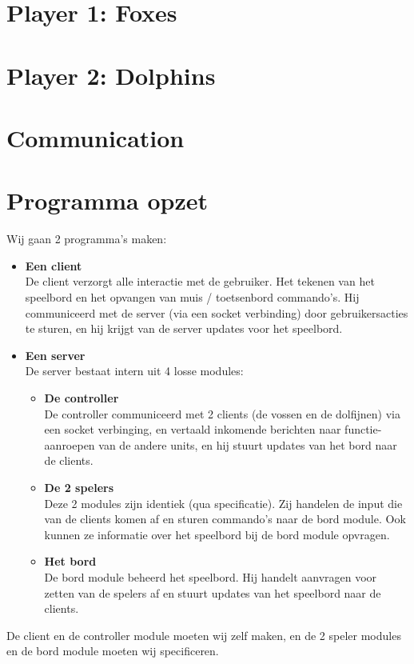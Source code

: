 \documentclass[a4paper,twoside,11pt]{article}
\begin{document}
\section{Player 1: Foxes}

\section{Player 2: Dolphins}

\section{Communication}

\section{Programma opzet} %
\label{sec:programma_opzet}
Wij gaan 2 programma's maken:
\begin{itemize}
\item \textbf{Een client} \\
De client verzorgt alle interactie met de gebruiker. Het tekenen van het speelbord en het opvangen van muis / toetsenbord commando's. Hij communiceerd met de server (via een socket verbinding) door gebruikersacties te sturen, en hij krijgt van de server updates voor het speelbord.
\item \textbf{Een server} \\
De server bestaat intern uit 4 losse modules:
  \begin{itemize}
  \item \textbf{De controller} \\
  De controller communiceerd met 2 clients (de vossen en de dolfijnen) via een socket verbinging, en vertaald inkomende berichten naar functie-aanroepen van de andere units, en hij stuurt updates van het bord naar de clients.
  \item \textbf{De 2 spelers} \\
  Deze 2 modules zijn identiek (qua specificatie). Zij handelen de input die van de clients komen af en sturen commando's naar de bord module. Ook kunnen ze informatie over het speelbord bij de bord module opvragen.
  \item \textbf{Het bord} \\
  De bord module beheerd het speelbord. Hij handelt aanvragen voor zetten van de spelers af en stuurt updates van het speelbord naar de clients.
  \end{itemize}
\end{itemize}

De client en de controller module moeten wij zelf maken, en de 2 speler modules en de bord module moeten wij specificeren.
\end{document}
